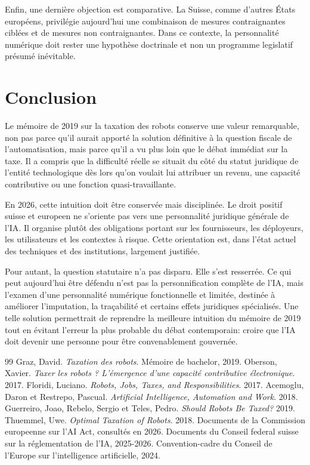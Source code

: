 \documentclass[11pt]{article}
\begin{document}
Enfin, une dernière objection est comparative. La Suisse, comme d'autres États européens, privilégie aujourd'hui une combinaison de mesures contraignantes ciblées et de mesures non contraignantes. Dans ce contexte, la personnalité numérique doit rester une hypothèse doctrinale et non un programme legislatif présumé inévitable.

\section{Conclusion}
Le mémoire de 2019 sur la taxation des robots conserve une valeur remarquable, non pas parce qu'il aurait apporté la solution définitive à la question fiscale de l'automatisation, mais parce qu'il a vu plus loin que le débat immédiat sur la taxe. Il a compris que la difficulté réelle se situait du côté du statut juridique de l'entité technologique dès lors qu'on voulait lui attribuer un revenu, une capacité contributive ou une fonction quasi-travaillante.

En 2026, cette intuition doit être conservée mais disciplinée. Le droit positif suisse et europeen ne s'oriente pas vers une personnalité juridique générale de l'IA. Il organise plutôt des obligations portant sur les fournisseurs, les déployeurs, les utilisateurs et les contextes à risque. Cette orientation est, dans l'état actuel des techniques et des institutions, largement justifiée.

Pour autant, la question statutaire n'a pas disparu. Elle s'est resserrée. Ce qui peut aujourd'hui être défendu n'est pas la personnification complète de l'IA, mais l'examen d'une personnalité numérique fonctionnelle et limitée, destinée à améliorer l'imputation, la traçabilité et certains effets juridiques spécialisés. Une telle solution permettrait de reprendre la meilleure intuition du mémoire de 2019 tout en évitant l'erreur la plus probable du débat contemporain: croire que l'IA doit devenir une personne pour être convenablement gouvernée.


\begin{thebibliography}{99}
 Graz, David. \textit{Taxation des robots}. Mémoire de bachelor, 2019.
 Oberson, Xavier. \textit{Taxer les robots ? L'émergence d'une capacité contributive électronique}. 2017.
 Floridi, Luciano. \textit{Robots, Jobs, Taxes, and Responsibilities}. 2017.
 Acemoglu, Daron et Restrepo, Pascual. \textit{Artificial Intelligence, Automation and Work}. 2018.
 Guerreiro, Joao, Rebelo, Sergio et Teles, Pedro. \textit{Should Robots Be Taxed?} 2019.
 Thuemmel, Uwe. \textit{Optimal Taxation of Robots}. 2018.
 Documents de la Commission europeenne sur l'AI Act, consultés en 2026.
 Documents du Conseil federal suisse sur la réglementation de l'IA, 2025-2026.
 Convention-cadre du Conseil de l'Europe sur l'intelligence artificielle, 2024.
\end{thebibliography}
\end{document}
